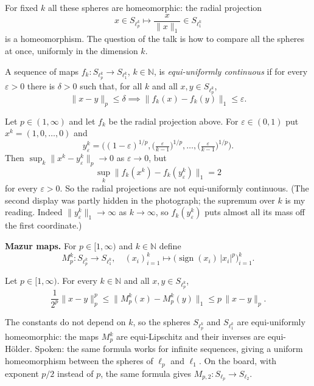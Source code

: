 For fixed $k$ all these spheres are
homeomorphic: the radial projection
$$
x \in S_{\ell_p^k}
\mapsto \frac{x}{\|x\|_1}
\in S_{\ell_1^k}
$$
is a homeomorphism. The question of the talk
is how to compare all the spheres at once,
uniformly in the dimension $k$.

\begin{definition}
\label{definition-equi-uniformly-continuous}
A sequence of maps
$f_k : S_{\ell_p^k} \to S_{\ell_1^k}$,
$k \in \mathbb{N}$, is
\emph{equi-uniformly continuous} if for every
$\varepsilon > 0$ there is $\delta > 0$ such
that, for all $k$ and all
$x,y \in S_{\ell_p^k}$,
$$
\|x - y\|_p \le \delta
\implies
\|f_k(x) - f_k(y)\|_1 \le \varepsilon.
$$
\end{definition}

\begin{exercise}
\label{exercise-radial-projection-not-equi}
Let $p \in (1,\infty)$ and let $f_k$ be the
radial projection above. For
$\varepsilon \in (0,1)$ put
$x^k = (1,0,\ldots,0)$ and
$$
y^k_\varepsilon
= \Big((1-\varepsilon)^{1/p},
\big(\tfrac{\varepsilon}{k-1}\big)^{1/p},
\ldots,
\big(\tfrac{\varepsilon}{k-1}\big)^{1/p}
\Big).
$$
Then
$\sup_k \|x^k - y^k_\varepsilon\|_p \to 0$ as
$\varepsilon \to 0$, but
$$
\sup_k \|f_k(x^k) - f_k(y^k_\varepsilon)\|_1
= 2
$$
for every $\varepsilon > 0$. So the radial
projections are not equi-uniformly
continuous. (The second display was partly
hidden in the photograph; the supremum over
$k$ is my reading. Indeed
$\|y^k_\varepsilon\|_1 \to \infty$ as
$k \to \infty$, so $f_k(y^k_\varepsilon)$
puts almost all its mass off the first
coordinate.)
\end{exercise}

\medskip\noindent
{\bf Mazur maps.} For $p \in [1,\infty)$ and
$k \in \mathbb{N}$ define
$$
M_p^k : S_{\ell_p^k} \to S_{\ell_1^k},
\quad
(x_i)_{i=1}^k \mapsto
\big(\operatorname{sign}(x_i)\,
|x_i|^p\big)_{i=1}^k.
$$

\begin{theorem}[Mazur, 1929]
\label{theorem-mazur-maps}
Let $p \in [1,\infty)$. For every
$k \in \mathbb{N}$ and all
$x,y \in S_{\ell_p^k}$,
$$
\frac{1}{2^p}\|x - y\|_p^p
\le \|M_p^k(x) - M_p^k(y)\|_1
\le p\,\|x - y\|_p.
$$
\end{theorem}

\noindent
The constants do not depend on $k$, so the
spheres $S_{\ell_p^k}$ and $S_{\ell_1^k}$ are
equi-uniformly homeomorphic: the maps
$M_p^k$ are equi-Lipschitz and their inverses
are equi-H\"older. Spoken: the same formula
works for infinite sequences, giving a
uniform homeomorphism between the spheres of
$\ell_p$ and $\ell_1$. On the board, with
exponent $p/2$ instead of $p$, the same
formula gives
$M_{p,2} : S_{\ell_p} \to S_{\ell_2}$.

